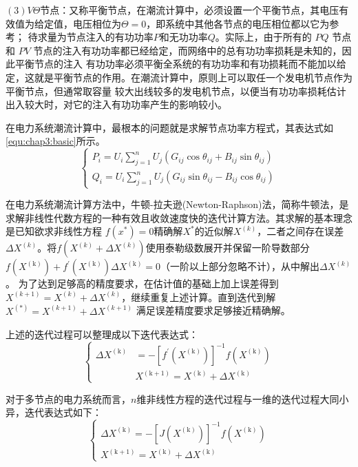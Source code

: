 $(3)$$V\Theta$节点：又称平衡节点，在潮流计算中，必须设置一个平衡节点，其电压有效值为给定值，电压相位为$\Theta =  0$，即系统中其他各节点的电压相位都以它为参考；
待求量为节点注入的有功功率$P$和无功功率$Q$。实际上，由于所有的 $PQ$ 节点和 $PV$ 节点的注入有功功率都已经给定，而网络中的总有功功率损耗是未知的，因此平衡节点的注入
有功功率必须平衡全系统的有功功率和有功损耗而不能加以给定，这就是平衡节点的作用。在潮流计算中，原则上可以取任一个发电机节点作为平衡节点，但通常取容量
较大出线较多的发电机节点，以便当有功功率损耗估计出入较大时，对它的注入有功功率产生的影响较小。

在电力系统潮流计算中，最根本的问题就是求解节点功率方程式，其表达式如\ref{equ:chap3:basic}所示。
\begin{equation}
\label{equ:chap3:basic}
  \left\{\begin{array}{l}{P_{i}=U_{i} \sum_{j=1}^{n} U_{j}\left(G_{i j} \cos \theta_{i j}+B_{i j} \sin \theta_{i j}\right)} \\ 
{Q_{i}=U_{i} \sum_{j=1}^{n} U_{j}\left(G_{i j} \sin \theta_{i j}-B_{i j} \cos \theta_{i j}\right)}\end{array}\right.  
\end{equation}

在电力系统潮流计算方法中，牛顿-拉夫逊(Newton-Raphson)法，简称牛顿法，是求解非线性代数方程的一种有效且收敛速度快的迭代计算方法。其求解的基本理念是已知欲求非线性方程
$f(x^{*})=0$精确解$X^{*}$的近似解$X^{(k)}$，二者之间存在误差$\Delta X^{(k)}$。将$f(X^{(k)} + \Delta X^{(k)})$使用泰勒级数展开并保留一阶导数部分
$f\left(X^{(\mathrm{k})}\right)+f^{\prime}\left(X^{(\mathrm{k})}\right) \Delta X^{(\mathrm{k})}=0$（一阶以上部分忽略不计），从中解出$\Delta X^{(k)}$。
为了达到足够高的精度要求，在估计值的基础上加上误差得到$X^{(k+1)} = X^{(k)} + \Delta X^{(k)}$，继续重复上述计算。直到迭代到解$X^{(*)}=X^{(k+1)}+\Delta X^{(k+1)}$
满足误差精度要求足够接近精确解。

上述的迭代过程可以整理成以下迭代表达式：
\begin{equation}
\left\{\begin{aligned} \Delta X^{(\mathrm{k})} &=-\left[f^{\prime}\left(X^{(\mathrm{k})}\right)\right]^{-1} f\left(X^{(\mathrm{k})}\right) \\
 & X^{(\mathrm{k}+1)}=X^{(\mathrm{k})}+\Delta X^{(\mathrm{k})} \end{aligned}\right.
\end{equation}

对于多节点的电力系统而言，$n$维非线性方程的迭代过程与一维的迭代过程大同小异，迭代表达式如下：
\begin{equation}
\label{equ:chap3:diedai}
\left\{\begin{array}{c}{\Delta X^{(\mathrm{k})}=-\left[J\left(X^{(\mathrm{k})}\right)\right]^{-1} f\left(X^{(\mathrm{k})}\right)} \\ 
{X^{(\mathrm{k}+1)}=X^{(\mathrm{k})}+\Delta X^{(\mathrm{k})}}\end{array}\right.
\end{equation}

